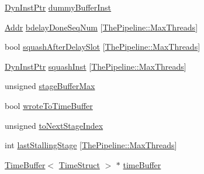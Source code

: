 \begin{DoxyCompactItemize}
\item 
\hyperlink{classRefCountingPtr}{DynInstPtr} \hyperlink{classPipelineStage_a09dc4a08ace7d6e74531ffff1ba5d905}{dummyBufferInst}
\item 
\hyperlink{base_2types_8hh_af1bb03d6a4ee096394a6749f0a169232}{Addr} \hyperlink{classPipelineStage_ab949b1ea7ed96a92d473eeaa17348bed}{bdelayDoneSeqNum} \mbox{[}\hyperlink{namespaceThePipeline_ac9c0bbe9cf27d93e08ea8ccc4096e633}{ThePipeline::MaxThreads}\mbox{]}
\item 
bool \hyperlink{classPipelineStage_ac364a786221f4a1741023dc82bc834f9}{squashAfterDelaySlot} \mbox{[}\hyperlink{namespaceThePipeline_ac9c0bbe9cf27d93e08ea8ccc4096e633}{ThePipeline::MaxThreads}\mbox{]}
\item 
\hyperlink{classRefCountingPtr}{DynInstPtr} \hyperlink{classPipelineStage_a2313a835690e0d98e53b1aa69754bb1f}{squashInst} \mbox{[}\hyperlink{namespaceThePipeline_ac9c0bbe9cf27d93e08ea8ccc4096e633}{ThePipeline::MaxThreads}\mbox{]}
\item 
unsigned \hyperlink{classPipelineStage_a8b3bf50b9e561c023857979eaf326bee}{stageBufferMax}
\item 
bool \hyperlink{classPipelineStage_a2c7e870d4babdac0dc91fc7ffabd0f3d}{wroteToTimeBuffer}
\item 
unsigned \hyperlink{classPipelineStage_ab6a826f43ca871b277e724aa148d1816}{toNextStageIndex}
\item 
int \hyperlink{classPipelineStage_ac171ebbc339fe3c1b91878034586b7a5}{lastStallingStage} \mbox{[}\hyperlink{namespaceThePipeline_ac9c0bbe9cf27d93e08ea8ccc4096e633}{ThePipeline::MaxThreads}\mbox{]}
\item 
\hyperlink{classTimeBuffer}{TimeBuffer}$<$ \hyperlink{structTimeStruct}{TimeStruct} $>$ $\ast$ \hyperlink{classPipelineStage_a83f9ee976e732665aeb08dbc19acfd45}{timeBuffer}
\end{DoxyCompactItemize}


